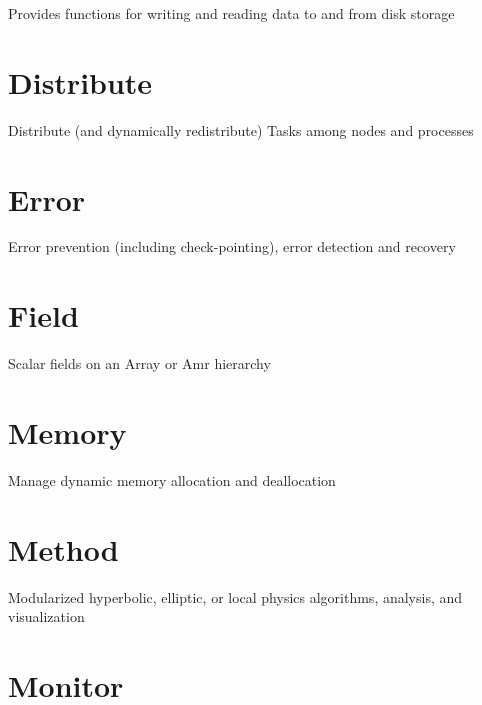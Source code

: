 \documentclass{book}
\begin{document}
Provides functions for writing and reading data to and from disk
storage

\section{Distribute}

Distribute (and dynamically redistribute) Tasks among nodes and
processes

\section{Error}

Error prevention (including check-pointing), error detection and
recovery

\section{Field}

Scalar fields on an Array or Amr hierarchy

\section{Memory}

Manage dynamic memory allocation and deallocation

\section{Method}

Modularized hyperbolic, elliptic, or local physics algorithms,
analysis, and visualization

\section{Monitor}
\end{document}
